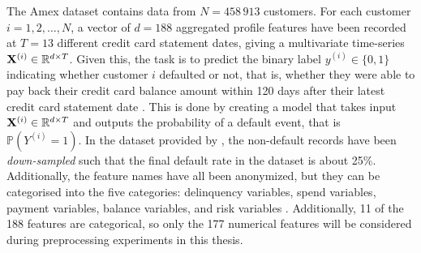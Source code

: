 \documentclass{statsmsc}
\begin{document}
{The Amex dataset contains data from $N=458\,913$ customers. For each customer
$i=1,2,\dots,N$, a vector of $d=188$ aggregated profile features have been
recorded at $T=13$ different credit card statement dates, giving a multivariate
time-series $\mathbf{X}^{(i)}\in \mathbb{R}^{d \times T}$. Given this, the task is to predict
the binary label $y^{(i)} \in \{0,1\}$ indicating whether customer $i$
defaulted or not, that is, whether they were able to pay back their credit card
balance amount within 120 days after their latest credit card statement date
\citep{amex-data}. This is done by creating a model that takes input
$\mathbf{X}^{(i)} \in \mathbb{R}^{d \times T}$ and outputs the probability of a default
event, that is $\mathbb{P}(Y^{(i)}=1)$.  In the dataset provided by
\cite{amex-data}, the non-default records have been \textit{down-sampled} such
that the final default rate in the dataset is about 25\%.  Additionally, the
feature names have all been anonymized, but they can be categorised into the
five categories: delinquency variables, spend variables, payment variables,
balance variables, and risk variables \citep{amex-data}.  Additionally, 11 of
the 188 features are categorical, so only the 177 numerical features will be
considered during preprocessing experiments in this thesis.

}
\end{document}
